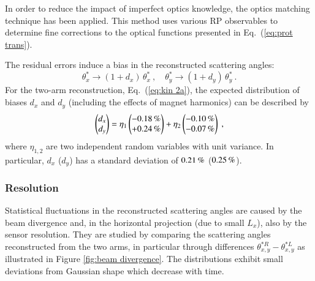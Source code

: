 In order to reduce the impact of imperfect optics knowledge, the optics matching technique \cite{totem-optics} has been applied. This method uses various RP observables to determine fine corrections to the optical functions presented in Eq.~(\ref{eq:prot trans}).

The residual errors induce a bias in the reconstructed scattering angles:
\begin{equation}
\label{eq:opt bias}
\theta_x^* \rightarrow (1 + d_x)\, \theta_x^*\ ,\quad
\theta_y^* \rightarrow (1 + d_y)\, \theta_y^*\ .
\end{equation}
For the two-arm reconstruction, Eq.~(\ref{eq:kin 2a}), the expected distribution of biases $d_x$ and $d_y$ (including the effects of magnet harmonics) can be described by
\begin{equation}
\label{eq:opt bias modes}
\begin{pmatrix} d_x\cr d_y \end{pmatrix} =
	\eta_1 \begin{pmatrix} -0.18\,{\rm \%} \cr +0.24\,{\rm \%} \end{pmatrix}
	+ \eta_2 \begin{pmatrix} -0.10\,{\rm \%} \cr -0.07\,{\rm \%} \end{pmatrix}\ ,
\end{equation}
where $\eta_{1,2}$ are two independent random variables with unit variance. In particular, $d_x$ ($d_y$) has a standard deviation of $0.21\,{\rm \%}$ ($0.25\,{\rm \%}$).





\subsubsection{Resolution}
\label{sec:resolution}

Statistical fluctuations in the reconstructed scattering angles are caused by the beam divergence and, in the horizontal projection (due to small $L_x$), also by the sensor resolution. They are studied by comparing the scattering angles reconstructed from the two arms, in particular through differences $\theta_{x,y}^{*R} - \theta_{x,y}^{*L}$ as illustrated in Figure \ref{fig:beam divergence}. The distributions exhibit small deviations from Gaussian shape which decrease with time.

